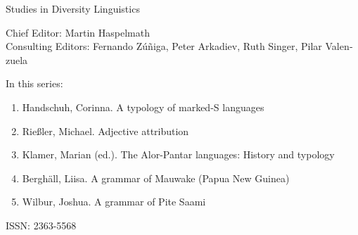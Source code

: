 {\large Studies in Diversity Linguistics}

\bigskip

Chief Editor: Martin Haspelmath \\
Consulting Editors: Fernando Zúñiga, Peter Arkadiev, Ruth Singer, Pilar Valen­zuela

\bigskip

In this series:

\begin{enumerate}
\item Handschuh, Corinna. A typology of marked-S languages
\item Rießler, Michael. Adjective attribution
\item Klamer, Marian (ed.). The Alor-Pantar languages: History and typology
\item Berghäll, Liisa. A grammar of Mauwake (Papua New Guinea)
\item Wilbur, Joshua. A grammar of Pite Saami
\end{enumerate}


\vfill

\gdef\lsISSN{2363-5568}%
\hfill ISSN: \lsISSN


